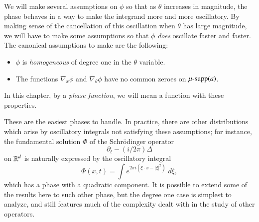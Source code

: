 We will make several assumptions on $\phi$ so that as $\theta$ increases in magnitude, the phase behaves in a way to make the integrand more and more oscillatory. By making sense of the cancellation of this oscillation when $\theta$ has large magnitude, we will have to make some assumptions so that $\phi$ \emph{does} oscillate faster and faster. The canonical assumptions to make are the following:
%
\begin{itemize}
	\item $\phi$ is \emph{homogeneous} of degree one in the $\theta$ variable.

	\item The functions $\nabla_x \phi$ and $\nabla_\theta \phi$ have no common zeroes on $\operatorname{\text{$\mu$-supp}}(a)$.
\end{itemize}
%
In this chapter, by a \emph{phase function}, we will mean a function with these properties.

These are the easiest phases to handle. In practice, there are other distributions which arise by oscillatory integrals not satisfying these assumptions; for instance, the fundamental solution $\Phi$ of the Schr\"{o}dinger operator
%
\[ \partial_t - (i/2\pi) \Delta \]
%
on $\operatorname{\mathbb{R}}^d$ is naturally expressed by the oscillatory integral
%
\[ \Phi(x,t) = \int e^{2 \pi i ( \xi \cdot x - |\xi|^2 )}\; d\xi, \]
%
which has a phase with a quadratic component. It is possible to extend some of the results here to such other phase, but the degree one case is simplest to analyze, and still features much of the complexity dealt with in the study of other operators.

